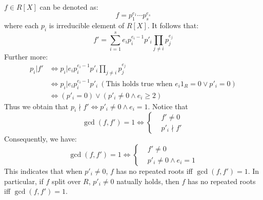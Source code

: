 $f \in R[X]$ can be denoted as:
\[
    f = p_1^{e_1} \cdots p_s^{e_s}
\]
where each $p_i$ is irreducible element of $R[X]$. It follows that:
\[
    f' = \sum_{i=1}^{s} e_i p_i^{e_i - 1} p'_i \prod_{j \neq i} p_{j}^{e_j}
\]
Further more:
\begin{align*}
    p_i | f' & \Leftrightarrow p_i | e_i p_i^{e_i - 1} p'_i \prod_{j \neq i} p_j^{e_j} \\
    & \Leftrightarrow p_i | e_i p_i^{e_i - 1} p'_i \ (\text{This holds true when } e_i 1_R = 0 \lor p'_i = 0) \\
    & \Leftrightarrow (p'_i = 0) \lor (p'_i \neq 0 \land e_i \geq 2)
\end{align*}
Thus we obtain that $p_i \nmid f' \Leftrightarrow p'_i \neq 0 \land e_i = 1$. Notice that
\[
    \gcd(f, f') = 1 \Leftrightarrow
    \left\{ 
        \begin{aligned}
            &f' \neq 0 \\
            &p'_i \nmid f'
        \end{aligned}
    \right.
\]
Consequently, we have:
\[
    \gcd(f, f') = 1 \Leftrightarrow
    \left\{ 
        \begin{aligned}
            &f' \neq 0 \\
            &p'_i \neq 0 \land e_i = 1
        \end{aligned}
    \right.
\]
This indicates that when $p'_i \neq 0$, $f$ has no repeated roots iff $\gcd(f, f') = 1$. In particular, if $f$ split over $R$, $p'_i \neq 0$ natually holds, then $f$ has no repeated roots iff $\gcd(f, f') = 1$.